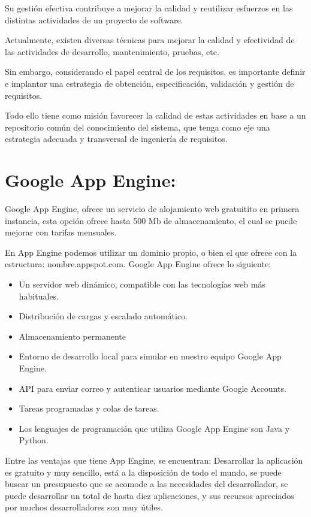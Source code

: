 \documentclass[conference,compsoc,onecolumn]{IEEEtran}
\begin{document}
Su gestión efectiva contribuye a mejorar la calidad y reutilizar esfuerzos en las distintas actividades de un proyecto de software.\newline

Actualmente, existen diversas técnicas para mejorar la calidad y efectividad de las actividades de desarrollo, mantenimiento, pruebas, etc.\newline

Sin embargo, considerando el papel central de los requisitos, es importante definir e implantar una estrategia de obtención, especificación, validación y gestión de requisitos.\newline

Todo ello tiene como misión favorecer la calidad de estas actividades en base a un repositorio común del conocimiento del sistema, que tenga como eje una estrategia adecuada y transversal de ingeniería de requisitos.

\section{Google App Engine:}

Google App Engine, ofrece un servicio de alojamiento web gratuitito en primera instancia, esta opción ofrece hasta 500 Mb de almacenamiento, el cual se puede mejorar con tarifas mensuales.\newline 

En App Engine podemos utilizar un dominio propio, o bien el que ofrece con la estructura: nombre.appspot.com. Google App Engine ofrece lo siguiente:

\begin{itemize}
    \item Un servidor web dinámico, compatible con las tecnologías web más habituales.
    \item Distribución de cargas y escalado automático.
    \item Almacenamiento permanente
    \item Entorno de desarrollo local para simular en nuestro equipo Google App Engine.
    \item API para enviar correo y autenticar usuarios mediante Google Accounts.
    \item Tareas programadas y colas de tareas.
    \item Los lenguajes de programación que utiliza Google App Engine son Java y Python.
\end{itemize}

Entre las ventajas que tiene App Engine, se encuentran: Desarrollar la aplicación es gratuito y muy sencillo, está a la disposición de todo el mundo, se puede buscar un presupuesto que se acomode a las necesidades del desarrollador, se puede desarrollar un total de hasta diez aplicaciones, y sus recursos apreciados por muchos desarrolladores son muy útiles.
\end{document}
